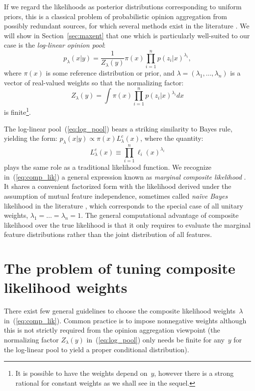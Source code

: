 \documentclass[english]{scrartcl}
\begin{document}
If we regard the likelihoods as posterior distributions corresponding to uniform priors, this is a classical problem of probabilistic opinion aggregation from possibly redundant sources, for which several methods exist in the literature \cite{Tarantola-82,Genest-86,Garg-04,Allard-12}. We will show in Section~\ref{sec:maxent} that one which is particularly well-suited to our case is the {\em log-linear opinion pool}: 
\begin{equation}
\label{eq:log_pool}
p_\lambda(x|y) = \frac{1}{Z_\lambda(y)} \pi(x) \prod_{i=1}^n p(z_i|x)^{\lambda_i},
\end{equation} 
where $\pi(x)$ is some reference distribution or prior, and $\lambda=(\lambda_1,\ldots,\lambda_n)$ is a vector of real-valued weights so that the normalizing factor:
$$
Z_\lambda(y) = \int \pi(x) \prod_{i=1}^n p(z_i|x)^{\lambda_i} dx
$$
is finite\footnote{It is possible to have the weights depend on~$y$, however there is a strong rational for constant weights as we shall see in the sequel.}. 

The log-linear pool~(\ref{eq:log_pool}) bears a striking similarity to Bayes rule, yielding the form: $p_\lambda(x|y)\propto \pi(x) L^c_\lambda(x)$, where the quantity:
\begin{equation}
\label{eq:comp_lik}
L^c_\lambda(x) \equiv \prod_{i=1}^n \ell_i (x)^{\lambda_i}
\end{equation} 
plays the same role as a traditional likelihood function. We recognize in~(\ref{eq:comp_lik}) a general expression known as {\em marginal composite likelihood} \cite{Varin-11}. It shares a convenient factorized form with the likelihood derived under the assumption of mutual feature independence, sometimes called {\em na\"ive Bayes} likelihood in the literature \cite{Ng-01}, which corresponds to the special case of all unitary weights, $\lambda_1=\ldots=\lambda_n= 1$. 
The general computational advantage of composite likelihood over the true likelihood is that it only requires to evaluate the marginal feature distributions rather than the joint distribution of all features. 


\section{The problem of tuning composite likelihood weights}

There exist few general guidelines to choose the composite likelihood weights~$\lambda$ in~(\ref{eq:comp_lik}). Common practice is to impose nonnegative weights \cite{Varin-11} although this is not strictly required from the opinion aggregation viewpoint (the normalizing factor $Z_\lambda(y)$ in~(\ref{eq:log_pool}) only needs be finite for any~$y$ for the log-linear pool to yield a proper conditional distribution). 
\end{document}
